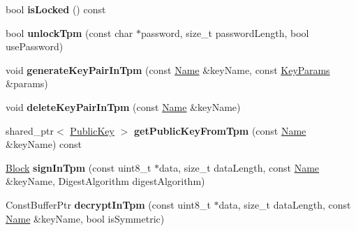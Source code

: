 \begin{DoxyCompactItemize}
\item 
bool {\bfseries is\+Locked} () const\hypertarget{classndn_1_1security_1_1KeyChain_a00d487606346d283bd11ea094b1bff72}{}\label{classndn_1_1security_1_1KeyChain_a00d487606346d283bd11ea094b1bff72}

\item 
bool {\bfseries unlock\+Tpm} (const char $\ast$password, size\+\_\+t password\+Length, bool use\+Password)\hypertarget{classndn_1_1security_1_1KeyChain_a8118fba3194815903e0311c5cc31c9de}{}\label{classndn_1_1security_1_1KeyChain_a8118fba3194815903e0311c5cc31c9de}

\item 
void {\bfseries generate\+Key\+Pair\+In\+Tpm} (const \hyperlink{classndn_1_1Name}{Name} \&key\+Name, const \hyperlink{classndn_1_1KeyParams}{Key\+Params} \&params)\hypertarget{classndn_1_1security_1_1KeyChain_ad6e98b79b1b3d7a183abd609b996facc}{}\label{classndn_1_1security_1_1KeyChain_ad6e98b79b1b3d7a183abd609b996facc}

\item 
void {\bfseries delete\+Key\+Pair\+In\+Tpm} (const \hyperlink{classndn_1_1Name}{Name} \&key\+Name)\hypertarget{classndn_1_1security_1_1KeyChain_a5a0c58de267a06079447f46f7b81857c}{}\label{classndn_1_1security_1_1KeyChain_a5a0c58de267a06079447f46f7b81857c}

\item 
shared\+\_\+ptr$<$ \hyperlink{classndn_1_1PublicKey}{Public\+Key} $>$ {\bfseries get\+Public\+Key\+From\+Tpm} (const \hyperlink{classndn_1_1Name}{Name} \&key\+Name) const\hypertarget{classndn_1_1security_1_1KeyChain_aaa251df44b30a2b0a27f9771e511693e}{}\label{classndn_1_1security_1_1KeyChain_aaa251df44b30a2b0a27f9771e511693e}

\item 
\hyperlink{classndn_1_1Block}{Block} {\bfseries sign\+In\+Tpm} (const uint8\+\_\+t $\ast$data, size\+\_\+t data\+Length, const \hyperlink{classndn_1_1Name}{Name} \&key\+Name, Digest\+Algorithm digest\+Algorithm)\hypertarget{classndn_1_1security_1_1KeyChain_a45a64a34da45e91885a3eec193908381}{}\label{classndn_1_1security_1_1KeyChain_a45a64a34da45e91885a3eec193908381}

\item 
Const\+Buffer\+Ptr {\bfseries decrypt\+In\+Tpm} (const uint8\+\_\+t $\ast$data, size\+\_\+t data\+Length, const \hyperlink{classndn_1_1Name}{Name} \&key\+Name, bool is\+Symmetric)\hypertarget{classndn_1_1security_1_1KeyChain_a5b09a74f6629f05303ba006d67ed80ce}{}\label{classndn_1_1security_1_1KeyChain_a5b09a74f6629f05303ba006d67ed80ce}


\end{DoxyCompactItemize}
